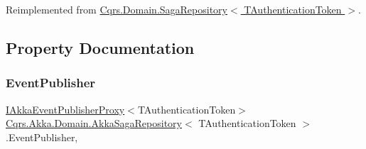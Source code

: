 Reimplemented from \hyperlink{classCqrs_1_1Domain_1_1SagaRepository_a1dec03959e4d859c6cf2be0507b1bc05_a1dec03959e4d859c6cf2be0507b1bc05}{Cqrs.\+Domain.\+Saga\+Repository$<$ T\+Authentication\+Token $>$}.



\subsection{Property Documentation}
\mbox{\label{classCqrs_1_1Akka_1_1Domain_1_1AkkaSagaRepository_a25957859d1f98ea7f434983c562e9724_a25957859d1f98ea7f434983c562e9724}} 
\subsubsection{\texorpdfstring{Event\+Publisher}{EventPublisher}}
{\footnotesize\ttfamily \hyperlink{interfaceCqrs_1_1Akka_1_1Events_1_1IAkkaEventPublisherProxy}{I\+Akka\+Event\+Publisher\+Proxy}$<$T\+Authentication\+Token$>$ \hyperlink{classCqrs_1_1Akka_1_1Domain_1_1AkkaSagaRepository}{Cqrs.\+Akka.\+Domain.\+Akka\+Saga\+Repository}$<$ T\+Authentication\+Token $>$.Event\+Publisher\hspace{0.3cm}{\ttfamily [get]}, {\ttfamily [protected]}}

